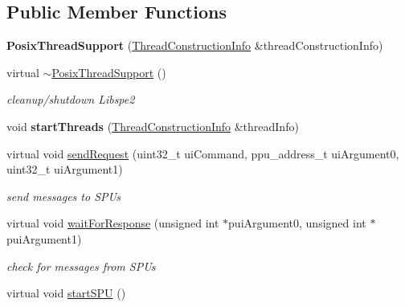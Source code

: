 \subsection*{Public Member Functions}
\begin{DoxyCompactItemize}
\item 
\mbox{\label{classPosixThreadSupport_a6b82e5cd33a67247d6ce7dd2c9c1be17}} 
{\bfseries Posix\+Thread\+Support} (\hyperlink{structPosixThreadSupport_1_1ThreadConstructionInfo}{Thread\+Construction\+Info} \&thread\+Construction\+Info)
\item 
\mbox{\label{classPosixThreadSupport_aa1ba225967d704b9485eb636b28d670a}} 
virtual \hyperlink{classPosixThreadSupport_aa1ba225967d704b9485eb636b28d670a}{$\sim$\+Posix\+Thread\+Support} ()
\begin{DoxyCompactList}\small\item\em cleanup/shutdown Libspe2 \end{DoxyCompactList}\item 
\mbox{\label{classPosixThreadSupport_a4afd23caaba58363c15c578157d364ba}} 
void {\bfseries start\+Threads} (\hyperlink{structPosixThreadSupport_1_1ThreadConstructionInfo}{Thread\+Construction\+Info} \&thread\+Info)
\item 
virtual void \hyperlink{classPosixThreadSupport_ab67534f720c0405821ea89cf05dd6b0f}{send\+Request} (uint32\+\_\+t ui\+Command, ppu\+\_\+address\+\_\+t ui\+Argument0, uint32\+\_\+t ui\+Argument1)
\begin{DoxyCompactList}\small\item\em send messages to S\+P\+Us \end{DoxyCompactList}\item 
virtual void \hyperlink{classPosixThreadSupport_a65bf7f0f96518d97f781b0559495f91d}{wait\+For\+Response} (unsigned int $\ast$pui\+Argument0, unsigned int $\ast$pui\+Argument1)
\begin{DoxyCompactList}\small\item\em check for messages from S\+P\+Us \end{DoxyCompactList}\item 
\mbox{\label{classPosixThreadSupport_a937bbc2c359429b0f0c1d9514ab150eb}} 
virtual void \hyperlink{classPosixThreadSupport_a937bbc2c359429b0f0c1d9514ab150eb}{start\+S\+PU} ()

\end{DoxyCompactItemize}
